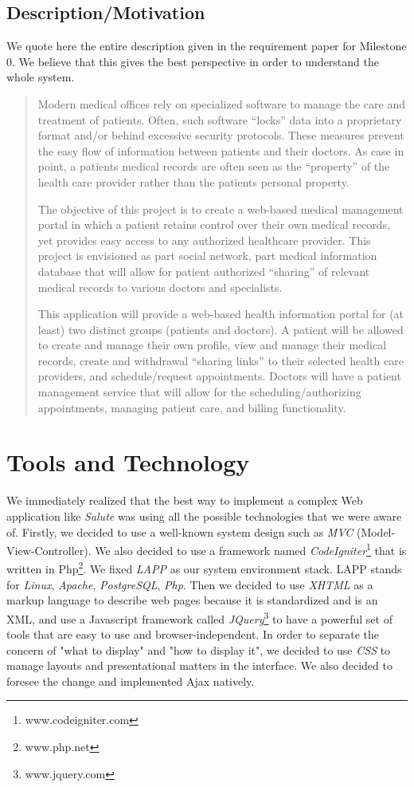 \documentclass[12pt]{report}
\begin{document}
\section{Description/Motivation}
We quote here the entire description given in the requirement paper for Milestone 0. We believe that this gives the best perspective in order to understand the whole system.
\begin{quotation}
   Modern medical offices rely on specialized software to manage the care and treatment of patients. Often,
such software “locks” data into a proprietary format and/or behind excessive security protocols. These
measures prevent the easy flow of information between patients and their doctors. As case in point, a
patients medical records are often seen as the “property” of the health care provider rather than the patients
personal property.
   
   The objective of this project is to create a web-based medical management portal in which a patient retains
control over their own medical records, yet provides easy access to any authorized healthcare provider. This
project is envisioned as part social network, part medical information database that will allow for patient
authorized “sharing” of relevant medical records to various doctors and specialists.
   
   This application will provide a web-based health information portal for (at least) two distinct groups
(patients and doctors). A patient will be allowed to create and manage their own profile, view and manage
their medical records, create and withdrawal “sharing links” to their selected health care providers, and
schedule/request appointments. Doctors will have a patient management service that will allow for the
scheduling/authorizing appointments, managing patient care, and billing functionality.
\end{quotation}


\chapter{Tools and Technology}
We immediately realized that the best way to implement a complex Web application like \emph{Salute} was using all the possible technologies that we were aware of. Firstly, we decided to use a well-known system design such as \emph{MVC} (Model-View-Controller). We also decided to use a framework named \emph{CodeIgniter}\footnote{www.codeigniter.com} that is written in Php\footnote{www.php.net}. We fixed \emph{LAPP} as our system environment stack. LAPP stands for \emph{Linux}, \emph{Apache}, \emph{PostgreSQL}, \emph{Php}. Then we decided to use \emph{XHTML} as a markup language to describe web pages because it is standardized and is an XML, and use a Javascript framework called \emph{JQuery}\footnote{www.jquery.com} to have a powerful set of tools that are easy to use and browser-independent. In order to separate the concern of "what to display" and "how to display it", we decided to use \emph{CSS} to manage layouts and presentational matters in the interface. We also decided to foresee the change and implemented Ajax natively.
\end{document}
